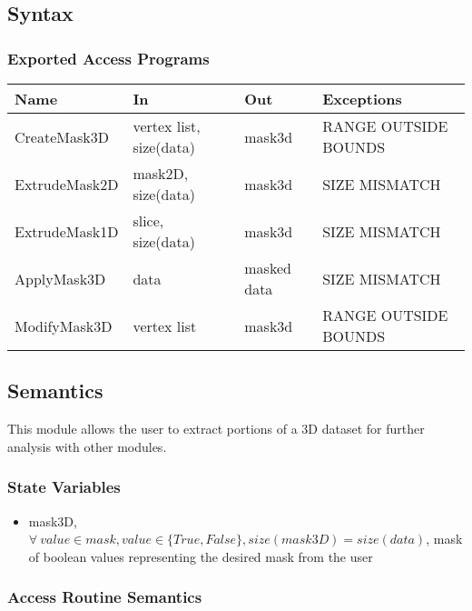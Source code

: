\documentclass[12pt, titlepage]{article}
\begin{document}
\subsection{Syntax}

\subsubsection{Exported Access Programs}

\begin{center}
    \begin{tabular}{p{3cm} p{4cm} p{4cm} p{4cm}}
        \hline
        \textbf{Name} & \textbf{In} & \textbf{Out} & \textbf{Exceptions} \\
        \hline
        CreateMask3D & vertex list, size(data) & mask3d & RANGE OUTSIDE BOUNDS \\
        ExtrudeMask2D & mask2D, size(data) & mask3d & SIZE MISMATCH \\
        ExtrudeMask1D & slice, size(data) & mask3d & SIZE MISMATCH \\
        ApplyMask3D & data & masked data & SIZE MISMATCH \\
        ModifyMask3D & vertex list & mask3d & RANGE OUTSIDE BOUNDS \\
        \hline
    \end{tabular}
\end{center}

\subsection{Semantics}
This module allows the user to extract portions of a 3D dataset for further
analysis with other modules.

\subsubsection{State Variables}
\begin{itemize}
    \item mask3D, $\forall\ value \in mask, value \in \{True,False\},
    size(mask3D) = size(data)$, mask of boolean values representing the desired mask
    from the user
\end{itemize}

\subsubsection{Access Routine Semantics}
\end{document}
